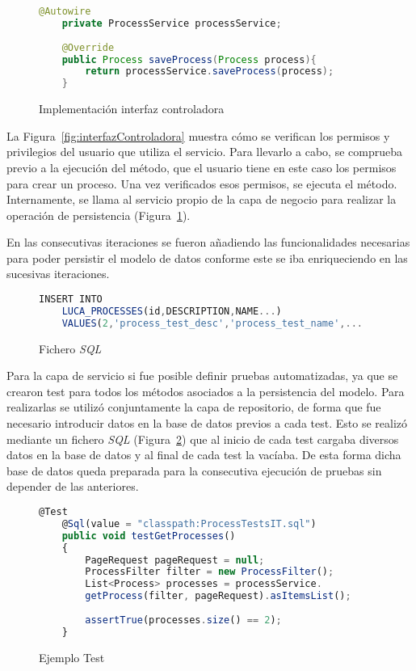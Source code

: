 \begin{figure}[H]
	\centering
	\begin{lstlisting}[language=Java]
	@Autowire
	private ProcessService processService;
	
	@Override
	public Process saveProcess(Process process){
		return processService.saveProcess(process);
	}\end{lstlisting}
	\caption{Implementación interfaz controladora}
	\label{fig:interfazControladoraImpl}
\end{figure}

La Figura~\ref{fig:interfazControladora} muestra cómo se verifican los permisos y privilegios del usuario que utiliza el servicio. Para llevarlo a cabo, se comprueba previo a la ejecución del método, que el usuario tiene en este caso los permisos para crear un proceso. Una vez verificados esos permisos, se ejecuta el método. Internamente, se llama al servicio propio de la capa de negocio para realizar la operación de persistencia (Figura~\ref{fig:interfazControladoraImpl}).

En las consecutivas iteraciones se fueron añadiendo las funcionalidades necesarias para poder persistir el modelo de datos conforme este se iba enriqueciendo en las sucesivas iteraciones. 

\begin{figure}[H]
	\centering
	\begin{lstlisting}[language=Javascript]
	INSERT INTO
	LUCA_PROCESSES(id,DESCRIPTION,NAME...)
	VALUES(2,'process_test_desc','process_test_name',...\end{lstlisting}
	\caption{Fichero \emph{SQL}}
	\label{fig:sqlFile}
\end{figure}

Para la capa de servicio si fue posible definir pruebas automatizadas, ya que se crearon test para todos los métodos asociados a la persistencia del modelo. Para realizarlas se utilizó conjuntamente la capa de repositorio, de forma que fue necesario introducir datos en la base de datos previos a cada test. Esto se realizó mediante un fichero \emph{SQL} (Figura~\ref{fig:sqlFile}) que al inicio de cada test cargaba diversos datos en la base de datos y al final de cada test la vacíaba. De esta forma dicha base de datos queda preparada para la consecutiva ejecución de pruebas sin depender de las anteriores.

\begin{figure}[H]
	\centering
	\begin{lstlisting}[language=Javascript]
	@Test
	@Sql(value = "classpath:ProcessTestsIT.sql")
	public void testGetProcesses()
	{
		PageRequest pageRequest = null;
		ProcessFilter filter = new ProcessFilter();
		List<Process> processes = processService.
		getProcess(filter, pageRequest).asItemsList();
		
		assertTrue(processes.size() == 2);
	}\end{lstlisting}
	\caption{Ejemplo Test}
	\label{fig:testExample}
\end{figure}


